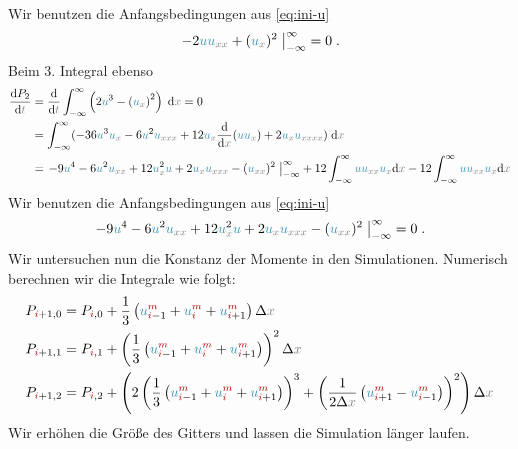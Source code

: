 \documentclass[10pt,fleqn,%
reqno,a4paper]{article}
\makeatletter
\def\mathcolor#1#{\@mathcolor{#1}}
\def\@mathcolor#1#2#3{%
        \protect\leavevmode
        \begingroup\color#1{#2}#3\endgroup
}
\newcommand{\nx}{\mathcolor{gray}{x}}
\newcommand{\nt}{\mathcolor{gray}{t}}
\newcommand{\nnu}{\mathcolor{cyan!70!black}{u}}
\newcommand{\ncosh}{\mathcolor{blue!70!black}{\cosh}}
\newcommand{\nni}{\mathcolor{red!70!black}{i}}
\newcommand{\nm}{\mathcolor{red!70!black}{m}}
\newcommand{\dif}{\mathrm{d}}
\makeatother
\begin{document}
Wir benutzen die Anfangsbedingungen aus \ref{eq:ini-u}
\begin{align*}
        \left.-2\nnu\nnu _{\nx \nx}  +(\nnu _{\nx })^2\; \right|_{-\infty}^{\infty}=0\;.
\end{align*}
Beim 3. Integral ebenso
\begin{align*}
        \frac{\dif P_2}{\dif\nt} &= \frac{\dif }{\dif\nt}\int_{-\infty}^{\infty} \left(2\nnu^3 - \left(  \nnu_{\nx}\right)^2 \right)\;\mathrm{d}\nx = 0\\
        &=  \int_{-\infty}^{\infty} (-36\nnu^3\nnu_{\nx } -6\nnu^2\nnu_{\nx \nx \nx }+12\nnu_{\nx }\frac{\dif }{\dif\nx}(\nnu \nnu_{\nx }) + 2\nnu_{\nx } \nnu_{\nx \nx \nx \nx})\;\mathrm{d}\nx \\
        &= \left.-9\nnu^4-6\nnu^2\nnu_{\nx \nx} + 12\nnu_{\nx }^2\nnu+2\nnu_{\nx }\nnu_{\nx \nx \nx }-(\nnu_{\nx \nx})^2\; \right|_{-\infty}^{\infty}+12\int_{-\infty}^{\infty} \nnu \nnu_{\nx \nx} \nnu_{\nx }\dif \nx-12\int_{-\infty}^{\infty} \nnu \nnu_{\nx \nx} \nnu_{\nx }\dif \nx%
\end{align*}
Wir benutzen die Anfangsbedingungen aus \ref{eq:ini-u}
\begin{align*}
        \left.-9\nnu^4-6\nnu^2\nnu_{\nx \nx} + 12\nnu_{\nx }^2\nnu+2\nnu_{\nx }\nnu_{\nx \nx \nx }-(\nnu_{\nx \nx})^2\; \right|_{-\infty}^{\infty}=0\;.
\end{align*}
Wir untersuchen nun die Konstanz der Momente in den Simulationen. 
Numerisch berechnen wir die Integrale wie folgt:
\begin{align}
P_{\nni+1,0}& = P_{\nni,0}+\frac{1}{3} \left(\nnu{_{\nni-1} ^{\nm}} + \nnu{_{\nni}^{\nm}} + \nnu{_{\nni+1}^{\nm}} \right) \Delta \nx\\
P_{\nni+1,1}&= P_{\nni,1}+\left(\frac{1}{3} \left(\nnu{_{\nni-1} ^{\nm}} + \nnu{_{\nni}^{\nm}} + \nnu{_{\nni+1}^{\nm}} \right) \right) ^2 \Delta \nx\\
P_{\nni+1,2}&= P_{\nni,2}+\left(2\left(\frac{1}{3} \left(\nnu{_{\nni-1} ^{\nm}} + \nnu{_{\nni}^{\nm}} + \nnu{_{\nni+1}^{\nm}} \right) \right) ^3 + \left(\frac{1}{2\Delta \nx} \left(\nnu{_{\nni+1}^{\nm}} - \nnu{_{\nni-1}^{\nm}} \right) \right)^2 \right)\Delta \nx
\end{align}
Wir erhöhen die Größe des Gitters und lassen die Simulation länger laufen. 
\end{document}
